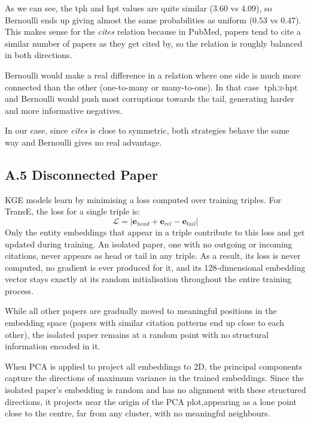 \documentclass{article}
\begin{document}
  As we can see, the tph and hpt values are quite similar ($3.60$ vs $4.09$),
  so Bernoulli ends up giving almost the same probabilities as uniform
  ($0.53$ vs $0.47$). This makes sense for the \textit{cites} relation because
  in PubMed, papers tend to cite a similar number of papers as they get
  cited by, so the relation is roughly balanced in both directions.

  Bernoulli would make a real difference in a relation where one side is
  much more connected than the other (one-to-many or many-to-one). In that
  case $\text{tph} \gg \text{hpt}$ and Bernoulli would push most corruptions
  towards the tail, generating harder and more informative negatives.

  In our case, since \textit{cites} is close to symmetric, both strategies
  behave the same way and Bernoulli gives no real advantage.

\subsection*{A.5 \hspace{0.3em} Disconnected Paper}
 KGE models learn by minimising a loss computed over training triples.
  For TransE, the loss for a single triple is:
  \[
    \mathcal{L} = |\mathbf{e}_{head} + \mathbf{e}_{rel} - \mathbf{e}_{tail}|
  \]
  Only the entity embeddings that appear in a triple contribute to this
  loss and get updated during training. An isolated paper, one with no
  outgoing or incoming citations, never appears as head or tail in any
  triple. As a result, its loss is never computed, no gradient is ever
  produced for it, and its 128-dimensional embedding vector stays exactly
  at its random initialisation throughout the entire training process.

  While all other papers are gradually moved to meaningful positions in
  the embedding space (papers with similar citation patterns end up close
  to each other), the isolated paper remains at a random point with no
  structural information encoded in it.

  When PCA is applied to project all embeddings to 2D, the principal
  components capture the directions of maximum variance in the trained
  embeddings. Since the isolated paper's embedding is random and has no
  alignment with these structured directions, it projects near the origin
  of the PCA plot,appearing as a lone point close to the centre, far
  from any cluster, with no meaningful neighbours.
\end{document}
